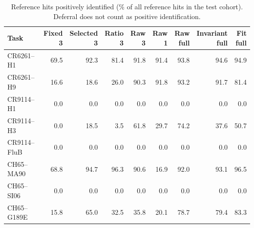 \begin{table}[t]
\centering\footnotesize
\caption{Reference hits positively identified (\% of all reference hits in the test cohort). Deferral does not count as positive identification.}
\setlength{\tabcolsep}{4pt}
\begin{tabular}{lrrrrrrrr}
\toprule
Task & \shortstack{Fixed\\3} & \shortstack{Selected\\3} & \shortstack{Ratio\\3} & \shortstack{Raw\\3} & \shortstack{Raw\\1} & \shortstack{Raw\\full} & \shortstack{Invariant\\full} & \shortstack{Fit\\full} \\
\midrule
CR6261--H1 & 69.5 & 92.3 & 81.4 & 91.8 & 91.4 & 93.8 & 94.6 & 94.9 \\
CR6261--H9 & 16.6 & 18.6 & 26.0 & 90.3 & 91.8 & 93.2 & 91.7 & 81.4 \\
CR9114--H1 & 0.0 & 0.0 & 0.0 & 0.0 & 0.0 & 0.0 & 0.0 & 0.0 \\
CR9114--H3 & 0.0 & 18.5 & 3.5 & 61.8 & 29.7 & 74.2 & 37.6 & 50.7 \\
CR9114--FluB & 0.0 & 0.0 & 0.0 & 0.0 & 0.0 & 0.0 & 0.0 & 0.0 \\
CH65--MA90 & 68.8 & 94.7 & 96.3 & 90.6 & 16.9 & 92.0 & 93.1 & 96.5 \\
CH65--SI06 & 0.0 & 0.0 & 0.0 & 0.0 & 0.0 & 0.0 & 0.0 & 0.0 \\
CH65--G189E & 15.8 & 65.0 & 32.5 & 35.8 & 20.1 & 78.7 & 79.4 & 83.3 \\
\bottomrule
\end{tabular}
\end{table}
